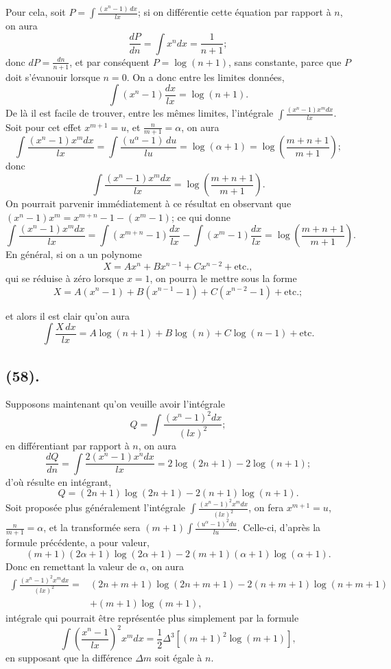 \documentclass{article}
\begin{document}
Pour cela, soit $\displaystyle P=\int\frac{(x^{n}-1)\,dx}{lx}$; si on différentie cette équation par rapport à $n$, on aura
\[ \frac{dP}{dn}=\int x^{n}dx=\frac{1}{n+1}; \]
donc $dP=\frac{dn}{n+1}$, et par conséquent $P=\log(n+1)$, sans constante, parce que $P$ doit s'évanouir lorsque $n=0$. On a donc entre les limites données,
\[ \int(x^{n}-1)\frac{dx}{lx}=\log(n+1). \tag{1} \]
De là il est facile de trouver, entre les mêmes limites, l'intégrale $\displaystyle\int\frac{(x^{n}-1)x^{m}dx}{lx}$. Soit pour cet effet $x^{m+1}=u$, et $\frac{n}{m+1}=\alpha$, on aura
\[ \int\frac{(x^{n}-1)x^{m}dx}{lx}=\int\frac{(u^{\alpha}-1)\,du}{lu}=\log(\alpha+1)=\log\left(\frac{m+n+1}{m+1}\right); \]
donc
\[ \int\frac{(x^{n}-1)x^{m}dx}{lx}=\log\left(\frac{m+n+1}{m+1}\right). \tag{2} \]
On pourrait parvenir immédiatement à ce résultat en observant que $(x^{n}-1)x^{m}=x^{m+n}-1-(x^{m}-1)$; ce qui donne
\[ \int\frac{(x^{n}-1)x^{m}dx}{lx}=\int(x^{m+n}-1)\frac{dx}{lx}-\int(x^{m}-1)\frac{dx}{lx}=\log\left(\frac{m+n+1}{m+1}\right). \]
En général, si on a un polynome
\[ X=Ax^{n}+Bx^{n-1}+Cx^{n-2}+\text{etc.}, \]
qui se réduise à zéro lorsque $x=1$, on pourra le mettre sous la forme
\[ X=A(x^{n}-1)+B(x^{n-1}-1)+C(x^{n-2}-1)+\text{etc.}; \]

et alors il est clair qu'on aura
\[ \int\frac{X\,dx}{lx}=A\log(n+1)+B\log(n)+C\log(n-1)+\text{etc.} \]

\subsection*{(58).}

Supposons maintenant qu'on veuille avoir l'intégrale
\[ Q=\int\frac{(x^{n}-1)^{2}dx}{(lx)^{2}}; \]
en différentiant par rapport à $n$, on aura
\[ \frac{dQ}{dn}=\int\frac{2(x^{n}-1)x^{n}dx}{lx}=2\log(2n+1)-2\log(n+1); \]
d'où résulte en intégrant,
\[ Q=(2n+1)\log(2n+1)-2(n+1)\log(n+1). \tag{3} \]
Soit proposée plus généralement l'intégrale $\displaystyle\int\frac{(x^{n}-1)^{2}x^{m}dx}{(lx)^{2}}$, on fera $x^{m+1}=u$, $\frac{n}{m+1}=\alpha$, et la transformée sera $\displaystyle(m+1)\int\frac{(u^{\alpha}-1)^{2}du}{lu}$. Celle-ci, d'après la formule précédente, a pour valeur,
\[ (m+1)(2\alpha+1)\log(2\alpha+1)-2(m+1)(\alpha+1)\log(\alpha+1). \]
Donc en remettant la valeur de $\alpha$, on aura
\[ \begin{aligned} \int\frac{(x^{n}-1)^{2}x^{m}dx}{(lx)^{2}}={}&(2n+m+1)\log(2n+m+1)-2(n+m+1)\log(n+m+1)\\ &+(m+1)\log(m+1), \end{aligned} \]
intégrale qui pourrait être représentée plus simplement par la formule
\[ \int\left(\frac{x^{n}-1}{lx}\right)^{2}x^{m}dx=\frac{1}{2}\Delta^{3}[(m+1)^{2}\log(m+1)], \tag{4} \]
en supposant que la différence $\Delta m$ soit égale à $n$.
\end{document}
